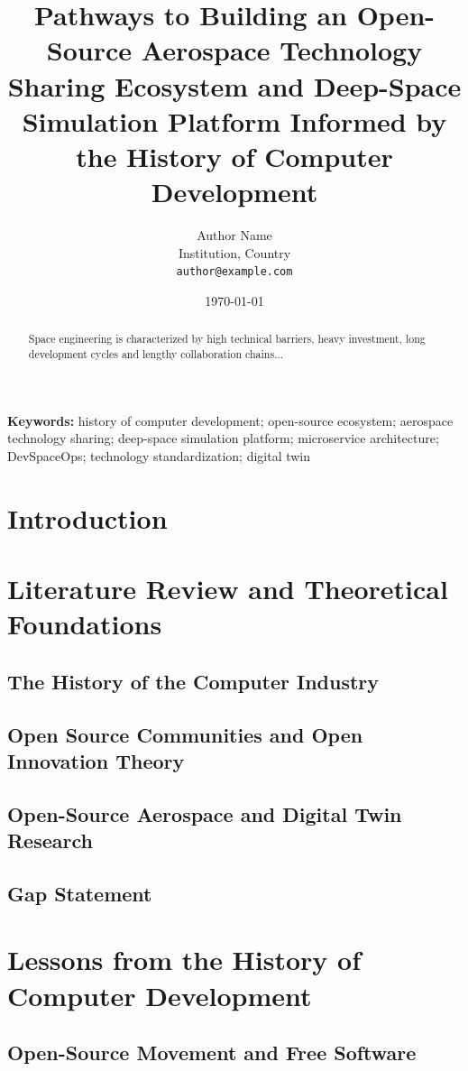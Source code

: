 \documentclass[11pt]{article}
\title{Pathways to Building an Open-Source Aerospace Technology Sharing
Ecosystem and Deep-Space Simulation Platform Informed by the History of
Computer Development}
\author{Author Name\\
\small Institution, Country\\
\small \texttt{author@example.com}
}
\date{\today}
\begin{document}
\maketitle

\begin{abstract}
Space engineering is characterized by high technical barriers, heavy
investment, long development cycles and lengthy collaboration chains...
\end{abstract}

\noindent\textbf{Keywords:} history of computer development; open-source
ecosystem; aerospace technology sharing; deep-space simulation platform;
microservice architecture; DevSpaceOps; technology standardization; digital twin

\section{Introduction}

\section{Literature Review and Theoretical Foundations}
\subsection{The History of the Computer Industry}
\subsection{Open Source Communities and Open Innovation Theory}
\subsection{Open-Source Aerospace and Digital Twin Research}
\subsection{Gap Statement}

\section{Lessons from the History of Computer Development}
\subsection{Open-Source Movement and Free Software}
\end{document}
